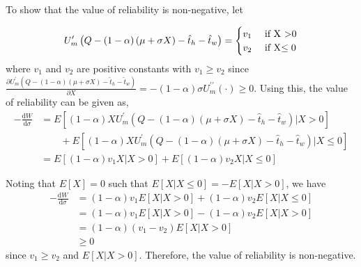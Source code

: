 \documentclass[12pt,a4paper,british]{article}
\makeatletter
\theoremstyle{definition}
\theoremstyle{plain}
\newenvironment{proof}[1][\proofname]{\par
    \normalfont\topsep6\p@\@plus6\p@\relax
    \trivlist
    \itemindent\parindent
    \item[\hskip\labelsep
          \scshape
      #1]\ignorespaces
  }{%
    \endtrivlist\@endpefalse
  }
\providecommand{\proofname}{Proof}
\theoremstyle{plain}
\theoremstyle{plain}
\makeatother
\begin{document}
\begin{proof}
To show that the value of reliability is non-negative, let

\begin{equation*}
U_{m}^{\prime}\left(Q-\left(1-\alpha\right)\left(\mu+\sigma X\right)-\hat{t}_{h}-\hat{t}_{w}\right)=\begin{cases}
v_{1} & \mbox{ if X >0}\\
v_{2} & \mbox{ if X\ensuremath{\leq0}}
\end{cases}
\end{equation*}%
where $v_{1}$ and $v_{2}$ are positive constants with $v_{1}\geq v_{2}$ since $\frac{\partial U_{m}^{\prime}\left(Q-\left(1-\alpha\right)\left(\mu+\sigma X\right)-\hat{t}_{h}-\hat{t}_{w}\right)}{\partial X}=-\left(1-\alpha\right)\sigma U_{m}^{\prime\prime}\left(\cdot\right)\geq0$. Using this, the value of reliability can be given as,%
\begin{align*}
-\frac{\mathrm{d}W}{\mathrm{d}\sigma} & =E\left[\left(1-\alpha\right)XU_{m}^{\prime}\left(Q-\left(1-\alpha\right)\left(\mu+\sigma X\right)-\hat{t}_{h}-\hat{t}_{w}\right)\vert X>0\right]\\
 & \qquad+E\left[\left(1-\alpha\right)XU_{m}^{\prime}\left(Q-\left(1-\alpha\right)\left(\mu+\sigma X\right)-\hat{t}_{h}-\hat{t}_{w}\right)\vert X\leq0\right]\\
 & =E\left[\left(1-\alpha\right)v_{1}X\vert X>0\right]+E\left[\left(1-\alpha\right)v_{2}X\vert X\leq0\right]
\end{align*}

Noting that $E\left[X\right]=0$ such that $E\left[X\vert X\leq0\right]=-E\left[X\vert X>0\right]$, we have
\begin{align*}
-\frac{\mathrm{d}W}{\mathrm{d}\sigma} & =\left(1-\alpha\right)v_{1}E\left[X\vert X>0\right]+\left(1-\alpha\right)v_{2}E\left[X\vert X\leq0\right]\\
 & =\left(1-\alpha\right)v_{1}E\left[X\vert X>0\right]-\left(1-\alpha\right)v_{2}E\left[X\vert X>0\right]\\
 & =\left(1-\alpha\right)\left(v_{1}-v_{2}\right)E\left[X\vert X>0\right]\\
 & \geq0
\end{align*}
since $v_{1}\geq v_{2}$ and $E\left[X\vert X>0\right]$. Therefore, the value of reliability is non-negative.


\end{proof}
\end{document}
